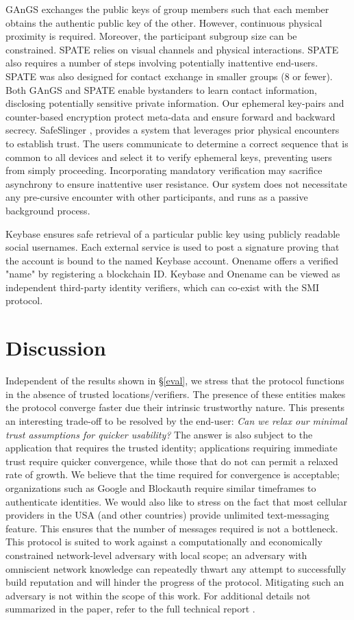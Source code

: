 \documentclass[letterpaper,twocolumn]{sig-alternate}
\begin{document}
GAnGS \cite{gangs} exchanges the public keys of group members such that each member obtains the authentic public key of the other. However, continuous physical proximity is required. Moreover, the participant subgroup size can be constrained. SPATE \cite{spate} relies on visual channels and physical interactions. SPATE also requires a number of steps involving potentially inattentive end-users. SPATE was also designed for contact exchange in smaller groups (8 or fewer). Both GAnGS and SPATE enable bystanders to learn contact information, disclosing potentially sensitive private information. Our ephemeral key-pairs and counter-based encryption protect meta-data and ensure forward and backward secrecy. SafeSlinger \cite{safeslinger}, provides a system that leverages prior physical encounters to establish trust. The users communicate to determine a correct sequence that is common to all devices and select it to verify ephemeral keys, preventing users from simply proceeding. Incorporating mandatory verification may sacrifice asynchrony to ensure inattentive user resistance. Our system does not necessitate any pre-cursive encounter with other participants, and runs as a passive background process.

Keybase \cite{keybase} ensures safe retrieval of a particular public key using publicly readable social usernames. Each external service is used to post a signature proving that the account is bound to the named Keybase account. Onename \cite{onename} offers a verified "name" by registering a blockchain ID. Keybase and Onename can be viewed as independent third-party identity verifiers, which can co-exist with the SMI protocol.
 \section{Discussion}
\label{ref:disc}

Independent of the results shown in \S \ref{eval}, we stress that the protocol functions in the absence of trusted locations/verifiers. The presence of these entities makes the protocol converge faster due their intrinsic trustworthy nature. This presents an interesting trade-off to be resolved by the end-user: {\em Can we relax our minimal trust assumptions for quicker usability?} The answer is also subject to the application that requires the trusted identity; applications requiring immediate trust require quicker convergence, while those that do not can permit a relaxed rate of growth. We believe that the time required for convergence is acceptable; organizations such as Google and Blockauth require similar timeframes to authenticate identities. We would also like to stress on the fact that most cellular providers in the USA (and other countries) provide unlimited text-messaging feature. This ensures that the number of messages required is not a bottleneck. This protocol is suited to work against a computationally and economically constrained network-level adversary with local scope; an adversary with omniscient network knowledge can repeatedly thwart any attempt to successfully build reputation and will hinder the progress of the protocol. Mitigating such an adversary is not within the scope of this work. For additional details not summarized in the paper, refer to the full technical report \cite{tech}.
\end{document}
